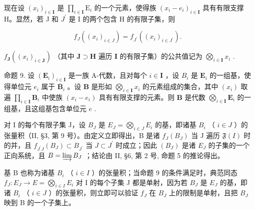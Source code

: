 现在设 \((x_{i})_{i\in \mathbf{I}}\) 是 \(\prod_{i\in \mathbf{I}}\mathrm{E}_i\) 的一个元素，使得族 \((x_{i} - e_{i})_{i\in \mathbf{I}}\) 具有有限支撑 H。显然，若 J 和 \(J^{\prime}\) 是 I 的两个包含 H 的有限子集，则

\[
f _ {J} ((x _ {i}) _ {i \in J}) = f _ {J ^ {\prime}} ((x _ {i}) _ {i \in J ^ {\prime}}).
\]

 \(f_{\mathbf{J}}((x_i)_{i \in \mathbf{J}})\) （其中 \(\mathbf{J} \supset \mathbf{H}\) 遍历 \(\mathbf{I}\) 的有限子集）的公共值记为 \(\bigotimes_{i \in \mathbf{I}} x_i\) .

命题 9. 设 \((\mathbf{E}_i)_{i\in \mathbf{I}}\) 是一族 A-代数，且对每个 \(i\in \mathbf{I}\) ，设 \(B_{i}\) 是 \(\mathbf{E}_i\) 的一组基，使得单位元 \(e_i\) 属于 \(\overline{\mathbf{B}}_i\) 。设 \(\mathbf{B}\) 是形如 \(\bigotimes_{i\in \mathbf{I}}x_i\) 的元素组成的集合，其中 \((x_{i})\) 取遍 \(\prod_{i\in \mathbf{I}}\mathbf{B}_i\) 中使族 \((x_{i} - e_{i})\) 具有有限支撑的元素。则 \(\mathbf{B}\) 是代数 \(\bigotimes_{i\in \mathbf{I}}\mathbf{E}_i\) 的一组基，且这组基包含单位元 \(e\) .

对 I 的每个有限子集 J，设 \(B_{J}\) 是 \(E_{J} = \bigotimes_{i \in J} E_{i}\) 的基，即诸基 \(B_{i}\) （ \(i \in J\) ）的张量积（II, §3, 第 9 号）。由定义立即得出，B 是诸 \(f_{J}(B_{J})\) 当 J 遍历 \(\mathfrak{F}(I)\) 时的并，且 \(f_{J^{\prime}J}(B_{J}) \subset B_{J^{\prime}}\) 当 \(J \subset J^{\prime}\) 时成立；因此 \((B_{J})\) 是诸 \(E_{J}\) 的子集的一个正向系统，且 \(B = \varinjlim B_{J}\) ；结论由 II, §6, 第 2 号, 命题 5 的推论得出。

基 B 也称为诸基 \(B_{i}\) （ \(i \in I\) ）的张量积；当命题 9 的条件满足时，典范同态 \(f_{J}: E_{J} \to E = \bigotimes_{i \in I} E_{i}\) 对 I 的每个子集 J 都是单射，因为若 \(B_{J}\) 是 \(E_{J}\) 的基，即诸 \(B_{i}\) （ \(i \in J\) ）的张量积，则立即可以验证 \(f_{J}\) 在 \(B_{J}\) 上的限制是单射，且把 \(B_{J}\) 映到 B 的一个子集上。

